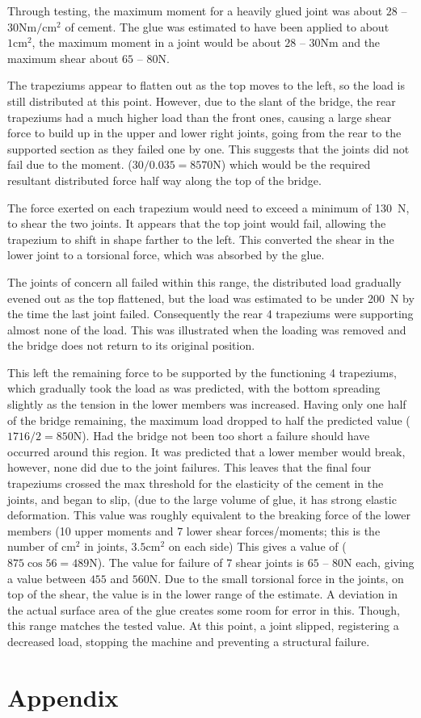 \documentclass[12pt]{article}
\begin{document}
Through testing, the maximum moment for a heavily glued joint was about $28$ -- $30\mathrm{Nm/cm^2}$ of cement. The glue was estimated to have been applied to about $1\mathrm{cm^2}$, the maximum moment in a joint would be about $28$ -- $30\mathrm{Nm}$ and the maximum shear about $65$ -- $80\mathrm{N}$. 

The trapeziums appear to flatten out as the top moves to the left, so the load is still distributed at this point. However, due to the slant of the bridge, the rear trapeziums had a much higher load than the front ones, causing a large shear force to build up in the upper and lower right joints, going from the rear to the supported section as they failed one by one. This suggests that the joints did not fail due to the moment. ($30 / 0.035 = 8570\mathrm{N}$) which would be the required resultant distributed force half way along the top of the bridge. 

The force exerted on each trapezium would need to exceed a minimum of 130~N, to shear the two joints. It appears that the top joint would fail, allowing the trapezium to shift in shape farther to the left. This converted the shear in the lower joint to a torsional force, which was absorbed by the glue. 

The joints of concern all failed within this range, the distributed load gradually evened out as the top flattened, but the load was estimated to be under 200~N by the time the last joint failed. 
Consequently the rear 4 trapeziums were supporting almost none of the load. This was illustrated when the loading was removed and the bridge does not return to its original position.

This left the remaining force to be supported by the functioning 4 trapeziums, which gradually took the load as was predicted, with the bottom spreading slightly as the tension in the lower members was increased. Having only one half of the bridge remaining, the maximum load dropped to half the predicted value ($1716 / 2 = 850\mathrm{N}$). Had the bridge not been too short a failure should have occurred around this region. It was predicted that a lower member would break, however, none did due to the joint failures. This leaves that the final four trapeziums crossed the max threshold for the elasticity of the cement in the joints, and began to slip, (due to the large volume of glue, it has strong elastic deformation. This value was roughly equivalent to the breaking force of the lower members (10 upper moments and 7 lower shear forces/moments; this is the number of $\mathrm{cm^2}$ in joints, $3.5 \mathrm{cm^2}$ on each side) This gives a value of ($875\cos 56 = 489\mathrm{N}$). The value for failure of 7 shear joints is $65$ -- $80\mathrm{N}$ each, giving a value between $455$ and $560\mathrm{N}$. Due to the small torsional force in the joints, on top of the shear, the value is in the lower range of the estimate. A deviation in the actual surface area of the glue creates some room for error in this. Though, this range matches the tested value.  At this point, a joint slipped, registering a decreased load, stopping the machine and preventing a structural failure.
\clearpage

\clearpage
\section*{Appendix}
\end{document}

